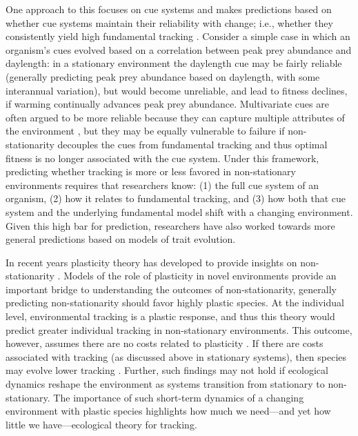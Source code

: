 \documentclass[11pt,letterpaper]{article}
\begin{document}
One approach to this focuses on cue systems and makes predictions based on whether cue systems maintain their reliability with change; i.e., whether they consistently yield high fundamental tracking \citep{bonamour2019}. Consider a simple case in which an organism's cues evolved based on a correlation between peak prey abundance and daylength: in a stationary environment the daylength cue may be fairly reliable (generally predicting peak prey abundance based on daylength, with some interannual variation), but would become unreliable, and lead to fitness declines, if warming continually advances peak prey abundance. Multivariate cues are often argued to be more reliable because they can capture multiple attributes of the environment \citep{dore2018,bonamour2019}, but they may be equally vulnerable to failure if non-stationarity decouples the cues from fundamental tracking \citep{bonamour2019} and thus optimal fitness is no longer associated with the cue system. Under this framework, predicting whether tracking is more or less favored in non-stationary environments requires that researchers know: (1) the full cue system of an organism, (2) how it relates to fundamental tracking, and (3) how both that cue system and the underlying fundamental model shift with a changing environment. Given this high bar for prediction, researchers have also worked towards more general predictions based on models of trait evolution.

In recent years plasticity theory has developed to provide insights on non-stationarity \citep[or `sustained environmental change,' see][]{chevin2010}. Models of the role of plasticity in novel environments provide an important bridge to understanding the outcomes of non-stationarity, generally predicting non-stationarity should favor highly plastic species. At the individual level, environmental tracking is a plastic response, and thus this theory would predict greater individual tracking in non-stationary environments. This outcome, however, assumes there are no costs related to plasticity \citep{Ghalambor2007,tufto2015}. If there are costs associated with tracking (as discussed above in stationary systems), then species may evolve lower tracking \citep{auld2010}. Further, such findings may not hold if ecological dynamics reshape the environment as systems transition from stationary to non-stationary. The importance of such short-term dynamics of a changing environment with plastic species highlights how much we need---and yet how little we have---ecological theory for tracking.
\end{document}
